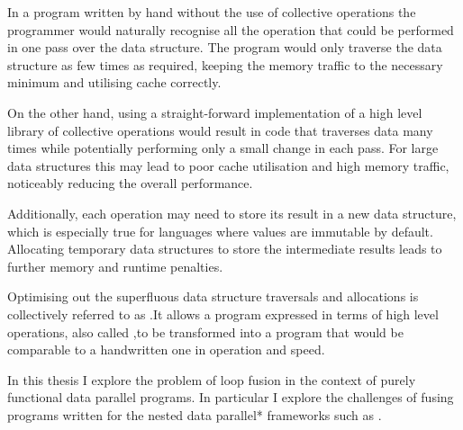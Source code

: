 \documentclass[preamble.tex]{subfiles}
\begin{document}
In a program written by hand without the use of collective operations the programmer would naturally recognise all the operation that could be performed in one pass over the data structure. The program would only traverse the data structure as few times as required, keeping the memory traffic to the necessary minimum and utilising cache correctly.

On the other hand, using a straight-forward implementation of a high level library of collective operations would result in code that traverses data many times while potentially performing only a small change in each pass. For large data structures this may lead to poor cache utilisation and high memory traffic, noticeably reducing the overall performance.

Additionally, each operation may need to store its result in a new data structure, which is especially true for languages where values are immutable by default. Allocating temporary data structures to store the intermediate results leads to further memory and runtime penalties.

Optimising out the superfluous data structure traversals and allocations is collectively referred to as .\ifusion It allows a program expressed in terms of high level operations, also called ,\icomb to be transformed into a program that would be comparable to a handwritten one in operation and speed.

In this thesis I explore the problem of loop fusion in the context of purely functional data parallel programs. In particular I explore the challenges of fusing programs written for the \*nested data parallel* frameworks such as .
\end{document}
